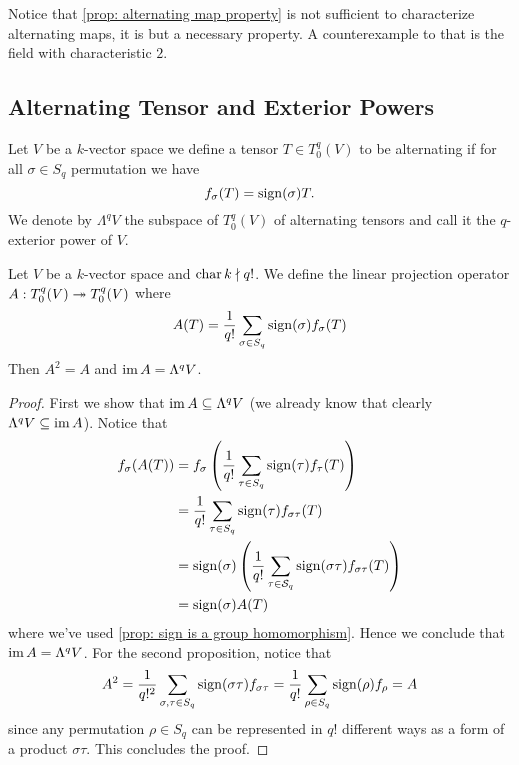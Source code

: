 \begin{remark}
    Notice that \cref{prop: alternating map property} is not sufficient to
    characterize alternating maps, it is but a necessary property. A
    counterexample to that is the field with characteristic \(2\).
\end{remark}

\subsection{Alternating Tensor and Exterior Powers}

\begin{definition}
    \label{def: alternating tensor}
    Let \(V\) be a \(k\)-vector space we define a tensor \(T \in T_0^q(V)\) to be
    alternating if for all \(\sigma \in S_q\) permutation we have
    \[
        f_\sigma(T) = \operatorname{sign}(\sigma) T.
    \]
    We denote by \(\Lambda^q V\) the subspace of \(T_0^q(V)\) of alternating
    tensors and call it the \(q\)-exterior power of \(V\).
\end{definition}

\begin{proposition}
    \label{prop: alternating projection}
    Let \(V\) be a \(k\)-vector space and \(\operatorname{char} k \nmid q!\). We
    define the linear projection operator \(A: T_0^q(V) \twoheadrightarrow T_0^q(V)\) where
    \[
        A(T) = \frac{1}{q!} \sum_{\sigma \in S_q} \operatorname{sign}(\sigma)
        f_\sigma(T)
    \]
    Then \(A^2 = A\) and \(\operatorname{im} A = \Lambda^q V\).
\end{proposition}

\begin{proof}
    First we show that \(\operatorname{im} A \subseteq \Lambda^q V\) (we already know that
    clearly \(\Lambda^q V \subseteq \operatorname{im} A\)). Notice that
    \begin{align*}
        f_\sigma(A(T))
         & = f_\sigma \left( \frac 1 {q!} \sum_{\tau \in S_q}
        \operatorname{sign}(\tau) f_\tau(T) \right)                                  \\
         & = \frac 1 {q!} \sum_{\tau \in S_q} \operatorname{sign}(\tau)
        f_{\sigma \tau}(T)                                             \\
         & = \operatorname{sign}(\sigma) \left( \frac 1 {q!} \sum_{\tau \in \mathcal
        S_q} \operatorname{sign}(\sigma \tau) f_{\sigma \tau}(T) \right)             \\
         & = \operatorname{sign}(\sigma) A(T)
    \end{align*}
    where we've used \cref{prop: sign is a group homomorphism}. Hence we conclude
    that \(\operatorname{im} A = \Lambda^q V\). For the second proposition, notice that
    \[
        A^2 = \frac 1 {q!^2} \sum_{\sigma, \tau \in S_q}
        \operatorname{sign}(\sigma \tau) f_{\sigma \tau}
        = \frac 1 {q!} \sum_{\rho \in S_q} \operatorname{sign}(\rho)
        f_\rho = A
    \]
    since any permutation \(\rho \in S_q\) can be represented in \(q!\)
    different ways as a form of a product \(\sigma \tau\). This concludes the
    proof.
\end{proof}

